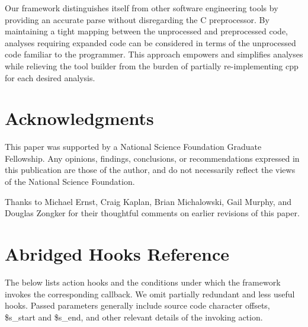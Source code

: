 \documentclass{article}
\newcommand{\Cpp}{\mbox{\textsf{cpp}}}
\newcommand{\C}{\mbox{C}}
\begin{document}
Our framework distinguishes itself from other software
engineering tools by providing an accurate parse without disregarding
the \C{} preprocessor.  By maintaining a tight
mapping between the unprocessed and preprocessed code, analyses
requiring expanded code can be considered in terms of the unprocessed
code familiar to the programmer.  This approach empowers and simplifies
analyses while relieving the tool builder from the burden of partially 
re-implementing \Cpp{} for each desired analysis.

\section*{Acknowledgments}
\label{sec:ack}
This paper was supported by a National Science Foundation Graduate
Fellowship. Any opinions, findings, conclusions, or recommendations
expressed in this publication are those of the author, and do not
necessarily reflect the views of the National Science Foundation.

Thanks to Michael Ernst, Craig Kaplan, Brian Michalowski, Gail Murphy, and Douglas
Zongker for their thoughtful comments on earlier revisions of this
paper.

\appendix

\section{Abridged Hooks Reference}
\label{sec:hooks}

The below lists action hooks and the conditions under which the
framework invokes the corresponding callback.  We omit partially
redundant and less useful hooks. Passed parameters
generally include source code character offsets, \$s\_\-start and
\$s\_\-end, and other relevant details of the invoking action.
\end{document}
